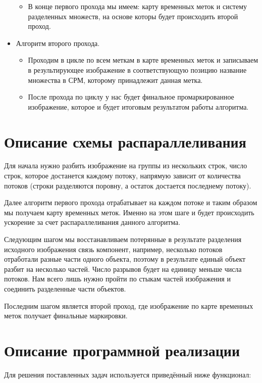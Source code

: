 \documentclass{report}
\begin{document}
\begin{itemize}
\begin{itemize}
\begin{enumerate}
				\end{enumerate}
				\item В конце первого прохода мы имеем: карту временных меток и систему разделенных множеств, на основе которы будет происходить второй проход.
			\end{itemize}
			\item Алгоритм второго прохода.
			\begin{itemize}
				\item Проходим в цикле по всем меткам в карте временных меток и записываем в результирующее изображение в соответствующую позицию название множества в СРМ, которому принадлежит данная метка.
				\item После прохода по циклу у нас будет финальное промаркированное изображение, которое и будет итоговым результатом работы алгоритма.
			\end{itemize}
		\end{itemize}
	\newpage


	\section*{Описание схемы распараллеливания}
		\par Для начала нужно разбить изображение на группы из нескольких строк, число строк, которое достанется каждому потоку, напрямую зависит от количества потоков (строки разделяются поровну, а остаток достается последнему потоку).
		\par Далее алгоритм первого прохода отрабатывает на каждом потоке и таким образом мы получаем карту временных меток. Именно на этом шаге и будет происходить ускорение за счет распараллеливания данного алгоритма.
		\par Следующим шагом мы восстанавливаем потерянные в результате разделения исходного изображения связь компонент, например, несколько потоков отработали разные части одного объекта, поэтому в результате единый объект разбит на несколько частей. Число разрывов будет на единицу меньше числа потоков. Нам всего лишь нужно пройти по стыкам частей изображения и соединить разделенные части объектов.
		\par Последним шагом является второй проход, где изображение по карте временных меток получает финальные маркировки.
	\newpage


	\section*{Описание программной реализации}
		\par Для решения поставленных задач используется приведённый ниже функционал:
\end{document}
